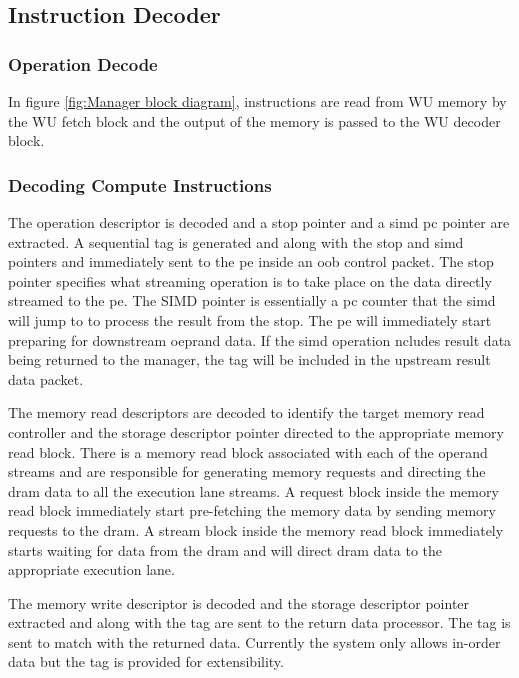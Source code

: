 \subsection{Instruction Decoder}
\label{sec:Instruction Decoder}

\subsubsection{Operation Decode}
\label{ssec:operationDecode}

In figure \ref{fig:Manager block diagram}, instructions are read from WU memory by the WU fetch block and the output of the memory is passed to the WU decoder block.

\subsubsection{Decoding Compute Instructions}
\label{sec:Decoding Compute Instructions}

The operation descriptor is decoded and a \ac{stop} pointer and a \ac{simd} \ac{pc} pointer are extracted. 
A sequential tag is generated and along with the \ac{stop} and \ac{simd} pointers and immediately sent to the \ac{pe} inside an \ac{oob} control packet.
The \ac{stop} pointer specifies what streaming operation is to take place on the data directly streamed to the \ac{pe}. 
The SIMD pointer is essentially a \ac{pc} counter that the \ac{simd} will jump to to process the result from the \ac{stop}.
The \ac{pe} will immediately start preparing for downstream oeprand data.
If the \ac{simd} operation ncludes result data being returned to the manager, the tag will be included in the upstream result data packet.

The memory read descriptors are decoded to identify the target memory read controller and the storage descriptor pointer directed to the appropriate memory read block.
There is a memory read block associated with each of the operand streams and are responsible for generating memory requests and directing the \ac{dram} data to all the execution lane streams.
A request block inside the memory read block immediately start pre-fetching the memory data by sending memory requests to the \ac{dram}.
A stream block inside the memory read block immediately starts waiting for data from the \ac{dram} and will direct \ac{dram} data to the appropriate execution lane.

The memory write descriptor is decoded and the storage descriptor pointer extracted and along with the tag are sent to the return data processor. The tag is sent to match with the returned data.
Currently the system only allows in-order data but the tag is provided for extensibility.

